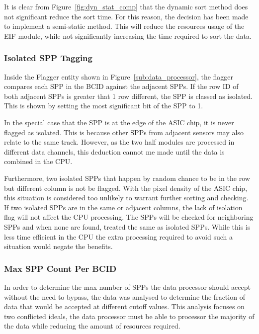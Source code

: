 			It is clear from Figure~\ref{fig:dyn_stat_comp} that the dynamic sort method does not significant reduce the sort time.
			For this reason, the decision has been made to implement a semi-static method.
			This will reduce the resources usage of the EIF module, while not significantly increasing the time required to sort the data.


			\subsubsection{Isolated SPP Tagging} %
			\label{sub:isolated_spp_tagging}
			
			Inside the Flagger entity shown in Figure~\ref{sub:data_processor}, the flagger compares each SPP in the BCID against the adjacent SPPs.
			If the row ID of both adjacent SPPs is greater that 1 row different, the SPP is classed as isolated.
			This is shown by setting the most significant bit of the SPP to 1.

			In the special case that the SPP is at the edge of the ASIC chip, it is never flagged as isolated.
			This is because other SPPs from adjacent sensors may also relate to the same track.
			However, as the two half modules are processed in different data channels, this deduction cannot me made until the data is combined in the CPU.

			Furthermore, two isolated SPPs that happen by random chance to be in the row but different column is not be flagged.
			With the pixel density of the ASIC chip, this situation is considered too unlikely to warrant further sorting and checking.
			If two isolated SPPs are in the same or adjacent columns, the lack of isolation flag will not affect the CPU processing.
			The SPPs will be checked for neighboring SPPs and when none are found, treated the same as isolated SPPs.
			While this is less time efficient in the CPU the extra processing required to avoid such a situation would negate the benefits.

			\subsubsection{Max SPP Count Per BCID} %
			\label{sub:max_spp_count_per_bcid}
			
			In order to determine the max number of SPPs the data processor should accept without the need to bypass, the data was analysed to determine the fraction of data that would be accepted at different cutoff values.
			This analysis focuses on two conflicted ideals, the data processor must be able to processor the majority of the data while reducing the amount of resources required.

